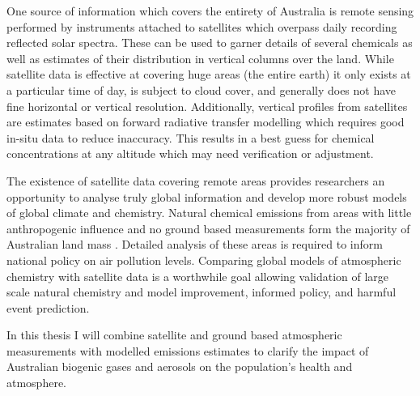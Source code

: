 One source of information which covers the entirety of Australia is remote sensing performed by instruments attached to satellites which overpass daily recording reflected solar spectra.
These can be used to garner details of several chemicals as well as estimates of their distribution in vertical columns over the land.
While satellite data is effective at covering huge areas (the entire earth) it only exists at a particular time of day, is subject to cloud cover, and generally does not have fine horizontal or vertical resolution.
Additionally, vertical profiles from satellites are estimates based on forward radiative transfer modelling which requires good in-situ data to reduce inaccuracy.
This results in a best guess for chemical concentrations at any altitude which may need verification or adjustment.

The existence of satellite data covering remote areas provides researchers an opportunity to analyse truly global information and develop more robust models of global climate and chemistry.
Natural chemical emissions from areas with little anthropogenic influence and no ground based measurements form the majority of Australian land mass \cite{VanDerA_2008}.
Detailed analysis of these areas is required to inform national policy on air pollution levels.
Comparing global models of atmospheric chemistry with satellite data is a worthwhile goal allowing validation of large scale natural chemistry and model improvement, informed policy, and harmful event prediction.

In this thesis I will combine satellite and ground based atmospheric measurements with modelled emissions estimates to clarify the impact of Australian biogenic gases and aerosols on the population's health and atmosphere.